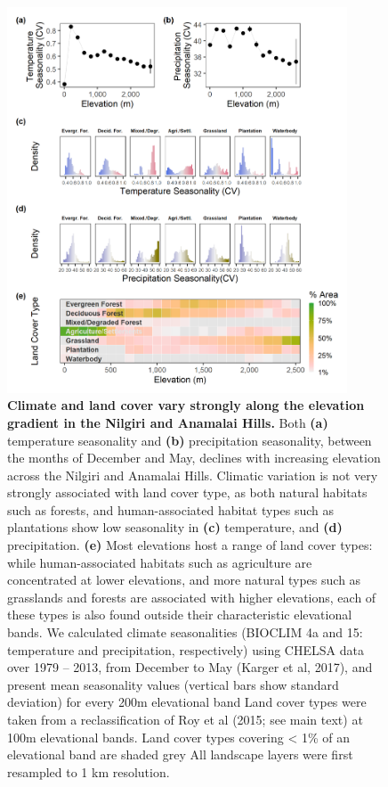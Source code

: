 \begin{figure}[h!]
    \centering
    \includegraphics[width=0.9\textwidth]{figures/hillybirds/fig_02.png}
    \caption{
        \textbf{Climate and land cover vary strongly along the elevation gradient in the Nilgiri and Anamalai Hills.}
        Both \textbf{(a)} temperature seasonality and \textbf{(b)} precipitation seasonality, between the months of December and May, declines with increasing elevation across the Nilgiri and Anamalai Hills. 
        Climatic variation is not very strongly associated with land cover type, as both natural habitats such as forests, and human-associated habitat types such as plantations show low seasonality in \textbf{(c)} temperature, and \textbf{(d)} precipitation.
        \textbf{(e)} Most elevations host a range of land cover types: while human-associated habitats such as agriculture are concentrated at lower elevations, and more natural types such as grasslands and forests are associated with higher elevations, each of these types is also found outside their characteristic elevational bands.
        We calculated climate seasonalities (BIOCLIM 4a and 15: temperature and precipitation, respectively) using CHELSA data over 1979 -- 2013, from December to May (Karger et al, 2017), and present mean seasonality values (vertical bars show standard deviation) for every 200m elevational band
        Land cover types were taken from a reclassification of Roy et al
        (2015; see main text) at 100m elevational bands.
        Land cover types covering < 1\% of an elevational band are shaded grey
        All landscape layers were first resampled to 1 km resolution.
    }
    \label{hilly_fig_02}
\end{figure}

